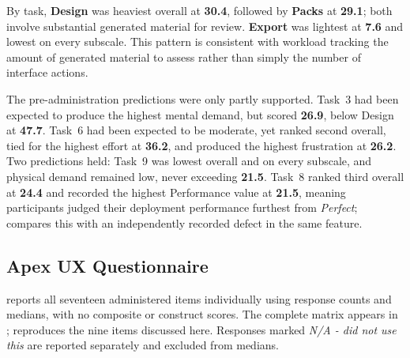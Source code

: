 By task, \textbf{Design} was heaviest overall at \textbf{30.4}, followed by \textbf{Packs} at \textbf{29.1}; both involve substantial generated material for review. \textbf{Export} was lightest at \textbf{7.6} and lowest on every subscale. This pattern is consistent with workload tracking the amount of generated material to assess rather than simply the number of interface actions.

The pre-administration predictions were only partly supported. Task~3 had been expected to produce the highest mental demand, but scored \textbf{26.9}, below Design at \textbf{47.7}. Task~6 had been expected to be moderate, yet ranked second overall, tied for the highest effort at \textbf{36.2}, and produced the highest frustration at \textbf{26.2}. Two predictions held: Task~9 was lowest overall and on every subscale, and physical demand remained low, never exceeding \textbf{21.5}. Task~8 ranked third overall at \textbf{24.4} and recorded the highest Performance value at \textbf{21.5}, meaning participants judged their deployment performance furthest from \emph{Perfect};  compares this with an independently recorded defect in the same feature.


\subsection{Apex UX Questionnaire}
\label{sec:results_ux}

 reports all seventeen administered items individually using response counts and medians, with no composite or construct scores. The complete matrix appears in ;  reproduces the nine items discussed here. Responses marked \emph{N/A - did not use this} are reported separately and excluded from medians.


